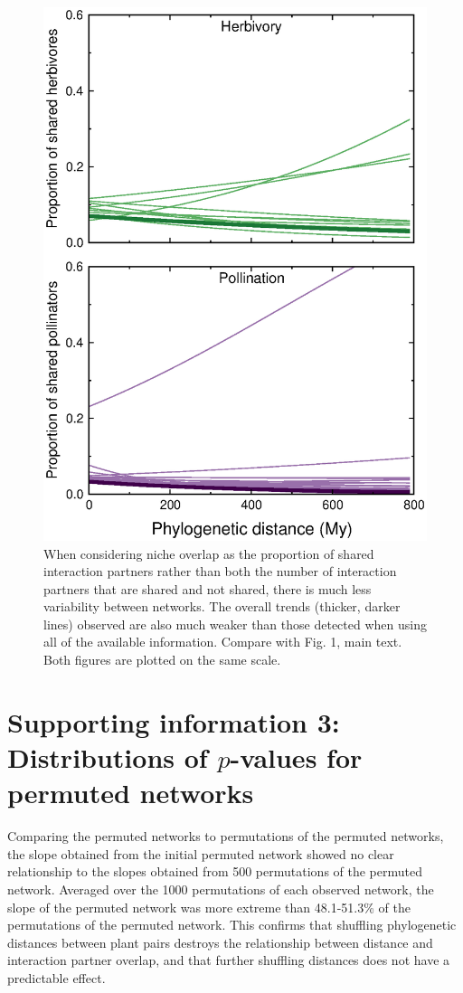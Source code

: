 \documentclass[12pt]{article}
\begin{document}
\begin{spacing}{1.0}
    \begin{figure}[!h]
        \begin{center}
          \centerline{\includegraphics*[width=.75\textwidth]{Figures/dataplots/proportion_regression_lines_full_color.eps}}
        \end{center}
         \caption{\small When considering niche overlap as the proportion of shared interaction partners rather than both the number of interaction partners that are shared and not shared, there is much less variability between networks. The overall trends (thicker, darker lines) observed are also much weaker than those detected when using all of the available information. Compare with Fig. 1, main text. Both figures are plotted on the same scale.
         }
        \label{lineplot}
      \end{figure}



\clearpage

\section*{Supporting information 3: Distributions of $p$-values for permuted networks}


    Comparing the permuted networks to permutations of the permuted networks, the slope obtained from the initial permuted network showed no clear relationship to the slopes obtained from 500 permutations of the permuted network. Averaged over the 1000 permutations of each observed network, the slope of the permuted network was more extreme than 48.1-51.3\% of the permutations of the permuted network. This confirms that shuffling phylogenetic distances between plant pairs destroys the relationship between distance and interaction partner overlap, and that further shuffling distances does not have a predictable effect.



\end{spacing}
\end{document}
